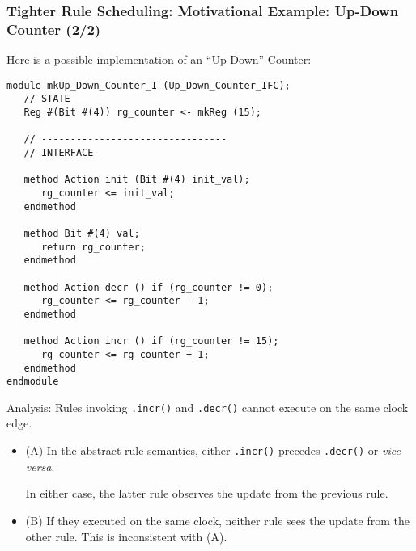\begin{frame}[fragile]
\frametitle{Tighter Rule Scheduling: Motivational Example: Up-Down Counter (2/2)}

\footnotesize

Here is a possible implementation of an ``Up-Down'' Counter:

\begin{minipage}{0.55\textwidth}\scriptsize
\begin{Verbatim}[frame=single]
module mkUp_Down_Counter_I (Up_Down_Counter_IFC);
   // STATE
   Reg #(Bit #(4)) rg_counter <- mkReg (15);

   // --------------------------------
   // INTERFACE

   method Action init (Bit #(4) init_val);
      rg_counter <= init_val;
   endmethod

   method Bit #(4) val;
      return rg_counter;
   endmethod

   method Action decr () if (rg_counter != 0);
      rg_counter <= rg_counter - 1;
   endmethod

   method Action incr () if (rg_counter != 15);
      rg_counter <= rg_counter + 1;
   endmethod
endmodule
\end{Verbatim}
\end{minipage}
\hm
\begin{minipage}{0.4\textwidth}

Analysis: Rules invoking {\tt .incr()} and {\tt .decr()} cannot execute on the same clock edge.

\begin{itemize}\scriptsize

 \item (A) In the abstract rule semantics, either {\tt .incr()}
       precedes {\tt .decr()} or \emph{vice versa}.

       \vspace{1ex}

       In either case, the latter rule observes the update from the previous rule.

       \vspace{4ex}

 \item (B) If they executed on the same clock, neither rule sees the
       update from the other rule.  This is inconsistent with (A).

\end{itemize}

\vspace{1ex}


\end{minipage}
\end{frame}
